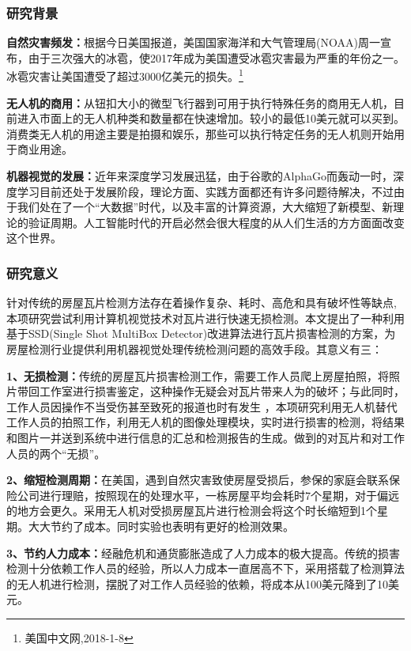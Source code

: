 \subsubsection{研究背景}
\textbf{自然灾害频发：}根据今日美国报道，美国国家海洋和大气管理局(NOAA)周一宣布，由于三次强大的冰雹，使2017年成为美国遭受冰雹灾害最为严重的年份之一。冰雹灾害让美国遭受了超过3000亿美元的损失。\footnote{美国中文网,2018-1-8}

\textbf{无人机的商用：}从钮扣大小的微型飞行器到可用于执行特殊任务的商用无人机，目前进入市面上的无人机种类和数量都在快速增加。较小的最低10美元就可以买到。消费类无人机的用途主要是拍摄和娱乐，那些可以执行特定任务的无人机则开始用于商业用途。

\textbf{机器视觉的发展：}近年来深度学习发展迅猛，由于谷歌的AlphaGo而轰动一时，深度学习目前还处于发展阶段，理论方面、实践方面都还有许多问题待解决，不过由于我们处在了一个“大数据”时代，以及丰富的计算资源，大大缩短了新模型、新理论的验证周期。人工智能时代的开启必然会很大程度的从人们生活的方方面面改变这个世界。

\subsubsection{研究意义}
针对传统的房屋瓦片检测方法存在着操作复杂、耗时、高危和具有破坏性等缺点,本项研究尝试利用计算机视觉技术对瓦片进行快速无损检测。本文提出了一种利用基于SSD(Single Shot MultiBox Detector)\cite{ssd}改进算法进行瓦片损害检测的方案，为房屋检测行业提供利用机器视觉处理传统检测问题的高效手段。其意义有三：

\textbf{1、无损检测：}传统的房屋瓦片损害检测工作，需要工作人员爬上房屋拍照，将照片带回工作室进行损害鉴定，这种操作无疑会对瓦片带来人为的破坏；与此同时，工作人员因操作不当受伤甚至致死的报道也时有发生 ，本项研究利用无人机替代工作人员的拍照工作，利用无人机的图像处理模块，实时进行损害的检测，将结果和图片一并送到系统中进行信息的汇总和检测报告的生成。做到的对瓦片和对工作人员的两个“无损”。

\textbf{2、缩短检测周期：}在美国，遇到自然灾害致使房屋受损后，参保的家庭会联系保险公司进行理赔，按照现在的处理水平，一栋房屋平均会耗时7个星期，对于偏远的地方会更久。采用无人机对受损房屋瓦片进行检测会将这个时长缩短到1个星期。大大节约了成本。同时实验也表明有更好的检测效果。

\textbf{3、节约人力成本：}经融危机和通货膨胀造成了人力成本的极大提高。传统的损害检测十分依赖工作人员的经验，所以人力成本一直居高不下，采用搭载了检测算法的无人机进行检测，摆脱了对工作人员经验的依赖，将成本从100美元降到了10美元。